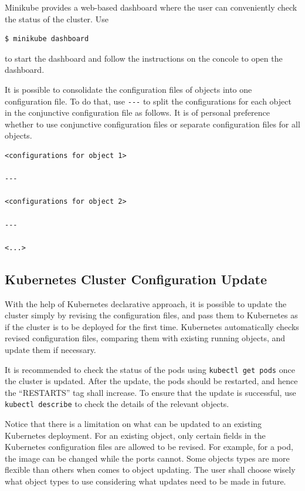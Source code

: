 Minikube provides a web-based dashboard where the user can conveniently check the status of the cluster. Use
\begin{lstlisting}
$ minikube dashboard
\end{lstlisting} 
to start the dashboard and follow the instructions on the concole to open the dashboard.

It is possible to consolidate the configuration files of objects into one configuration file. To do that, use \verb|---| to split the configurations for each object in the conjunctive configuration file as follows. It is of personal preference whether to use conjunctive configuration files or separate configuration files for all objects.
\begin{lstlisting}
<configurations for object 1>

---

<configurations for object 2>

---

<...>
\end{lstlisting}

\subsection{Kubernetes Cluster Configuration Update}

With the help of Kubernetes declarative approach, it is possible to update the cluster simply by revising the configuration files, and pass them to Kubernetes as if the cluster is to be deployed for the first time. Kubernetes automatically checks revised configuration files, comparing them with existing running objects, and update them if necessary.

It is recommended to check the status of the pods using \verb|kubectl get pods| once the cluster is updated. After the update, the pods should be restarted, and hence the ``RESTARTS'' tag shall increase. To ensure that the update is successful, use \verb|kubectl describe| to check the details of the relevant objects.

Notice that there is a limitation on what can be updated to an existing Kubernetes deployment. For an existing object, only certain fields in the Kubernetes configuration files are allowed to be revised. For example, for a pod, the image can be changed while the ports cannot. Some objects types are more flexible than others when comes to object updating. The user shall choose wisely what object types to use considering what updates need to be made in future.

